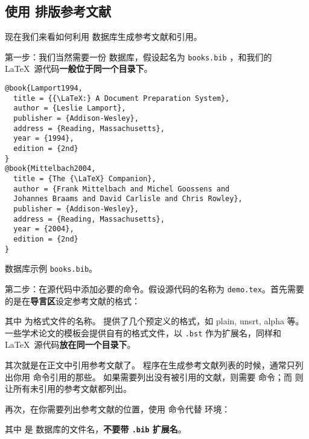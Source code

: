 \subsection{使用  排版参考文献}\label{subsec:bibtex-use}

现在我们来看如何利用  数据库生成参考文献和引用。

第一步：我们当然需要一份  数据库，假设起名为 \texttt{books.bib} ，和我们的 \LaTeX\ 源代码\textbf{一般位于同一个目录下}。

\begin{sourcecode}[htp]
\begin{Verbatim}
@book{Lamport1994,
  title = {{\LaTeX:} A Document Preparation System},
  author = {Leslie Lamport},
  publisher = {Addison-Wesley},
  address = {Reading, Massachusetts},
  year = {1994},
  edition = {2nd}
}
@book{Mittelbach2004,
  title = {The {\LaTeX} Companion},
  author = {Frank Mittelbach and Michel Goossens and 
  Johannes Braams and David Carlisle and Chris Rowley},
  publisher = {Addison-Wesley},
  address = {Reading, Massachusetts},
  year = {2004},
  edition = {2nd}
}
\end{Verbatim}
\caption{ 数据库示例 \texttt{books.bib}。}
\end{sourcecode}

第二步：在源代码中添加必要的命令。假设源代码的名称为 \texttt{demo.tex}。首先需要的是在\textbf{导言区}设定参考文献的格式：
\begin{command}
\end{command}

其中  为格式文件的名称。 提供了几个预定义的格式，如 plain, unsrt, alpha 等。
一些学术论文的模板会提供自有的格式文件，以 \texttt{.bst} 作为扩展名，同样和 \LaTeX\ 源代码\textbf{放在同一个目录下}。

其次就是在正文中引用参考文献了。 程序在生成参考文献列表的时候，通常只列出你用  命令引用的那些。
如果需要列出没有被引用的文献，则需要  命令；而 \marg*{*} 则让所有未引用的参考文献都列出。

再次，在你需要列出参考文献的位置，使用  命令代替  环境：
\begin{command}
\end{command}

其中  是  数据库的文件名，\textbf{不要带 \texttt{.bib} 扩展名}。

